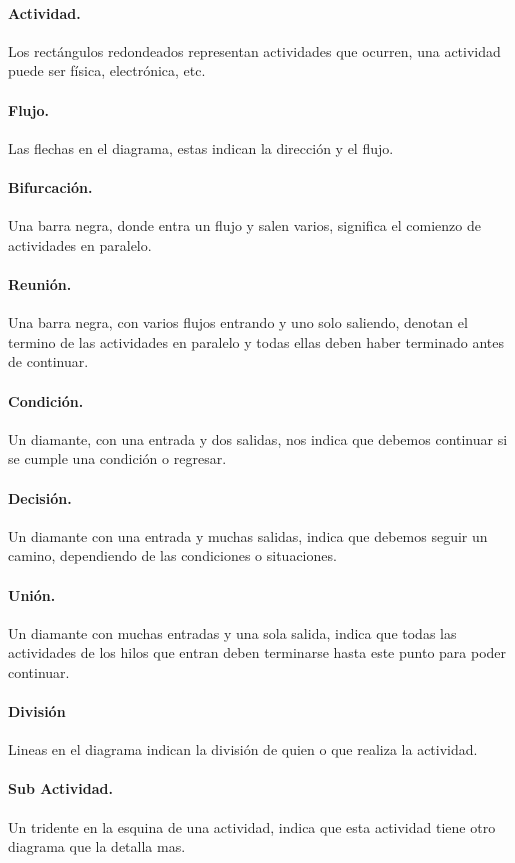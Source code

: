 \documentclass[spanish,12pt,letterpapper]{article}
\begin{document}
	\paragraph{Actividad.} Los rectángulos redondeados representan actividades que ocurren, una actividad puede ser física, electrónica, etc.
	\paragraph{Flujo.} Las flechas en el diagrama, estas indican la dirección y el flujo.
	\paragraph{Bifurcación.} Una barra negra, donde entra un flujo y salen varios, significa el comienzo de actividades en paralelo.
	\paragraph{Reunión.} Una barra negra, con varios flujos entrando y uno solo saliendo, denotan el termino de las actividades en paralelo y todas ellas deben haber terminado antes de continuar.
	\paragraph{Condición.} Un diamante, con una entrada y dos salidas, nos indica que debemos continuar si se cumple una condición o regresar.
	\paragraph{Decisión.} Un diamante con una entrada y muchas salidas, indica que debemos seguir un camino, dependiendo de las condiciones o situaciones.
	\paragraph{Unión.} Un diamante con muchas entradas y una sola salida, indica que todas las actividades de los hilos que entran deben terminarse hasta este punto para poder continuar.
	\paragraph{División} Lineas en el diagrama indican la división de quien o que realiza la actividad.
	\paragraph{Sub Actividad.} Un tridente en la esquina de una actividad, indica que esta actividad tiene otro diagrama que la detalla mas.
\end{document}
